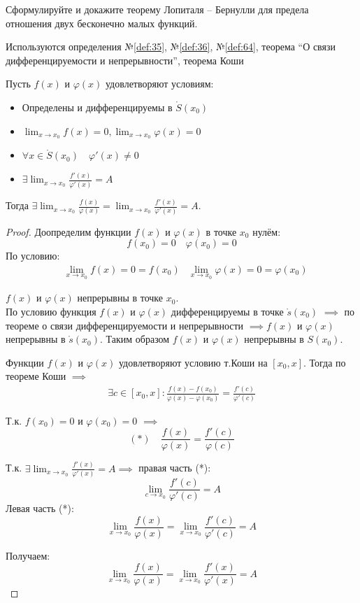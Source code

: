 \begin{question}
    Сформулируйте и докажите теорему Лопиталя – Бернулли для предела отношения двух бесконечно малых функций.
\end{question}
\begin{used}
    Используются определения №\ref{def:35}, №\ref{def:36}, №\ref{def:64}, теорема ``О связи дифференцируемости и непрерывности'', теорема Коши
\end{used}
\begin{theorem}
    Пусть $f(x)$ и  $\varphi(x)$ удовлетворяют условиям:
    \begin{itemize}
        \item Определены и дифференцируемы в $\mathring{S}(x_0)$
        \item $\lim_{x \to x_0} f(x) = 0, \lim_{x \to x_0} \varphi(x) = 0$
        \item $\forall x \in \mathring{S}(x_0) \quad \varphi'(x) \neq 0$
        \item $\exists \lim_{x \to x_0} \frac{f'(x)}{\varphi'(x)} = A$
    \end{itemize}
    Тогда $\exists \lim_{x \to x_0} \frac{f(x)}{\varphi(x)} = \lim_{x \to x_0} \frac{f'(x)}{\varphi'(x)} = A$.
\end{theorem}
\begin{proof}
    Доопределим функции $f(x)$ и $\varphi(x)$ в точке $x_0$ нулём: \[
        f(x_0) = 0 \quad \varphi(x_0) = 0
    \] 
    По условию:
    \begin{align*}
        &\lim_{x \to x_0} f(x) = 0 = f(x_0)
        &\lim_{x \to x_0} \varphi(x) = 0 = \varphi(x_0)
    \end{align*}
  
    $f(x)$ и  $\varphi(x)$ непрерывны в точке $x_0$.\\
    По условию функция $f(x)$ и  $\varphi(x)$ дифференцируемы в точке $\mathring{s}(x_0)$ $\implies$ по теореме о связи дифференцируемости и непрерывности $\implies f(x)$ и $\varphi(x)$ непрерывны в $\mathring{s}(x_0)$. Таким образом $f(x)$ и  $\varphi(x)$ непрерывны в $S(x_0)$.

    Функции $f(x)$ и  $\varphi(x)$ удовлетворяют условию т.Коши на $[x_0, x]$. Тогда по теореме Коши $\implies$ 
    \begin{gather*}
        \exists c \in [x_0, x] : \frac{f(x) - f(x_0)}{\varphi(x) - \varphi(x_0)} = \frac{f'(c)}{\varphi'(c)} \tag{*} 
    \end{gather*}

    Т.к. $f(x_0) = 0$ и $\varphi(x_0) = 0$ $\implies$ \[
        (*) \quad \boxed{\frac{f(x)}{\varphi(x)} = \frac{f'(c)}{\varphi(c)}}
    \] 

    Т.к. $\exists \lim_{x \to x_0} \frac{f'(x)}{\varphi'(x)} = A \implies$ правая часть (*): \[
        \lim_{c \to x_0} \frac{f'(c)}{\varphi'(c)} = A
    \] 
    Левая часть (*): \[
        \lim_{x \to x_0} \frac{f(x)}{\varphi(x)} = \lim_{x \to x_0} \frac{f'(c)}{\varphi'(c)} = A
    \] 

    Получаем: \[
        \lim_{x \to x_0} \frac{f(x)}{\varphi(x)} = \lim_{x \to x_0} \frac{f'(x)}{\varphi'(x)} = A
    \] 
\end{proof}
\pagebreak



